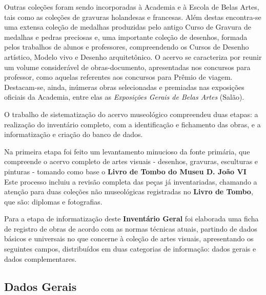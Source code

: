 Outras coleções foram sendo incorporadas à Academia e à Escola de Belas Artes, tais como as coleções de gravuras holandesas e francesas. Além destas encontra-se uma extensa coleção de medalhas produzidas pelo antigo Curso de Gravura de medalhas e pedras preciosas e, uma importante coleção de desenhos, formada pelos trabalhos de alunos e professores, compreendendo os Cursos de Desenho artístico, Modelo vivo e Desenho arquitetônico. O acervo se caracteriza por reunir um volume considerável de obras-documento, apresentadas nos concursos para professor, como aquelas referentes aos concursos para Prêmio de viagem. Destacam-se, ainda, inúmeras obras selecionadas e premiadas nas exposições oficiais da Academia, entre elas as \textit{Exposições Gerais de Belas Artes} (Salão).

O trabalho de sistematização do acervo museológico compreendeu duas etapas: a realização do inventário completo, com a identificação e fichamento das obras, e a informatização e criação do banco de dados.

Na primeira etapa foi feito um levantamento minucioso da fonte primária, que compreende o acervo completo de artes visuais - desenhos, gravuras, esculturas e pinturas - tomando como base o \textbf{Livro de Tombo do Museu D. João VI} Este processo incluiu a revisão completa das peças já inventariadas, chamando a atenção para duas coleções não museológicas registradas no \textbf{Livro de Tombo}, que são: diplomas e fotografias.

Para a etapa de informatização deste \textbf{Inventário Geral} foi elaborada uma ficha de registro de obras de acordo com as normas técnicas atuais, partindo de dados básicos e universais no que concerne à coleção de artes visuais, apresentando os seguintes campos, distribuídos em duas categorias de informação: dados gerais e dados complementares.

\subsection{Dados Gerais}
